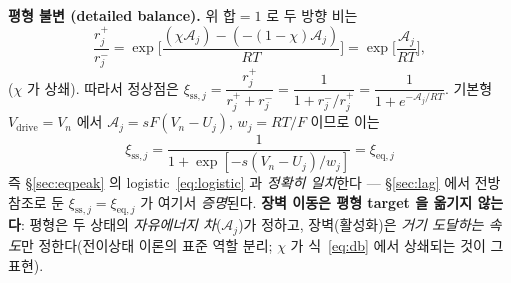 \documentclass[11pt,a4paper]{article}
\newcommand{\eq}{\mathrm{eq}}
\newcommand{\drive}{\mathrm{drive}}
\newcommand{\sstat}{\mathrm{ss}}
\begin{document}
\textbf{평형 불변 (detailed balance).} 위 합$=1$ 로 두 방향 비는
\begin{equation}
\frac{r_j^+}{r_j^-}=\exp\!\Big[\frac{(\chi\mathcal A_j)-(-(1-\chi)\mathcal A_j)}{RT}\Big]
=\exp\!\Big[\frac{\mathcal A_j}{RT}\Big],
\label{eq:db}
\end{equation}
($\chi$ 가 상쇄). 따라서 정상점은 $\xi_{\sstat,j}=\dfrac{r_j^+}{r_j^++r_j^-}=\dfrac{1}{1+r_j^-/r_j^+}
=\dfrac{1}{1+e^{-\mathcal A_j/RT}}$. 기본형 $V_\drive=V_n$ 에서 $\mathcal A_j=sF(V_n-U_j)$, $w_j=RT/F$ 이므로 이는
\begin{equation}
\xi_{\sstat,j}=\frac{1}{1+\exp[-s(V_n-U_j)/w_j]}=\xi_{\eq,j}
\label{eq:sseq}
\end{equation}
즉 \S\ref{sec:eqpeak} 의 logistic~\eqref{eq:logistic} 과 \emph{정확히 일치}한다 — \S\ref{sec:lag} 에서 전방참조로
둔 $\xi_{\sstat,j}=\xi_{\eq,j}$ 가 여기서 \emph{증명}된다. \textbf{장벽 이동은 평형 target 을 옮기지 않는다}: 평형은 두
상태의 \emph{자유에너지 차}($\mathcal A_j$)가 정하고, 장벽(활성화)은 \emph{거기 도달하는 속도}만 정한다(전이상태
이론의 표준 역할 분리; $\chi$ 가 식~\eqref{eq:db} 에서 상쇄되는 것이 그 표현).
\end{document}
